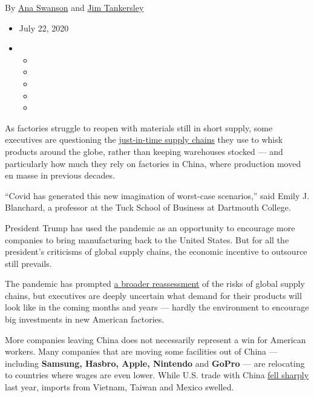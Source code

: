 By \href{https://www.nytimes.com/by/ana-swanson}{Ana Swanson} and
\href{https://www.nytimes.com/by/jim-tankersley}{Jim Tankersley}

\begin{itemize}
\item
  July 22, 2020
\item
  \begin{itemize}
  \item
  \item
  \item
  \item
  \item
  \end{itemize}
\end{itemize}

As factories struggle to reopen with materials still in short supply,
some executives are questioning the
\href{https://www.nytimes.com/2020/03/05/business/coronavirus-globalism.html}{just-in-time
supply chains} they use to whisk products around the globe, rather than
keeping warehouses stocked --- and particularly how much they rely on
factories in China, where production moved en masse in previous decades.

``Covid has generated this new imagination of worst-case scenarios,''
said Emily J. Blanchard, a professor at the Tuck School of Business at
Dartmouth College.

President Trump has used the pandemic as an opportunity to encourage
more companies to bring manufacturing back to the United States. But for
all the president's criticisms of global supply chains, the economic
incentive to outsource still prevails.

The pandemic has prompted
\href{https://www.nytimes.com/2020/03/05/business/coronavirus-globalism.html}{a
broader reassessment} of the risks of global supply chains, but
executives are deeply uncertain what demand for their products will look
like in the coming months and years --- hardly the environment to
encourage big investments in new American factories.

More companies leaving China does not necessarily represent a win for
American workers. Many companies that are moving some facilities out of
China --- including \textbf{Samsung, Hasbro, Apple, Nintendo} and
\textbf{GoPro} --- are relocating to countries where wages are even
lower. While U.S. trade with China
\href{https://www.nytimes.com/2020/02/05/business/economy/trump-trade.html}{fell
sharply} last year, imports from Vietnam, Taiwan and Mexico swelled.


